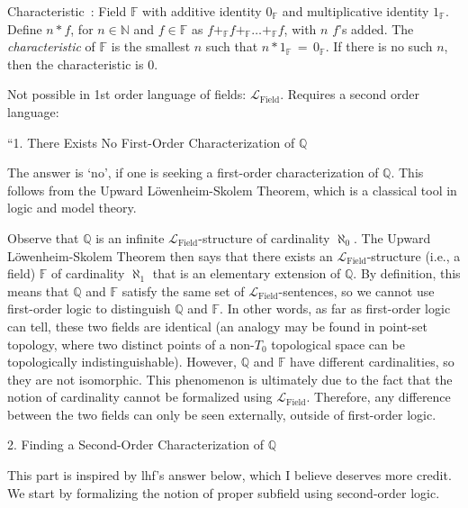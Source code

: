 Characteristic~\cite{wiki:Field_mathematics}: 
Field $\mathbb{F}$ with additive identity $0_{\mathbb{F}}$
and multiplicative identity $1_{\mathbb{F}}$.
Define $n \ast f$, for $n \in \mathbb{N}$ and $f \in \mathbb{F}$
as $f +_{\mathbb{F}} f +_{\mathbb{F}} \ldots +_{\mathbb{F}} f$, 
with $n$ $f$'s added.
The \textit{characteristic} of $\mathbb{F}$
is the smallest $n$ such that 
$n \ast 1_{\mathbb{F}} \,=\, 0_{\mathbb{F}}$.
If there is no such $n$, then the characteristic is 
$0$.


Not possible in 1st order language of fields:
$ \mathcal{L}_{\text{Field}} $.
Requires a second order language:


``1. There Exists No First-Order Characterization of $ \mathbb{Q} $

The answer is ‘no’, if one is seeking a first-order 
characterization of $ \mathbb{Q} $. 
This follows from the Upward Löwenheim-Skolem Theorem, 
which is a classical tool in logic and model theory.

Observe that $ \mathbb{Q} $ is an infinite 
$ \mathcal{L}_{\text{Field}} $-structure 
of cardinality $ \aleph_{0} $. 
The Upward L\"{o}wenheim-Skolem Theorem then says that 
there exists an $ \mathcal{L}_{\text{Field}} $-structure 
(i.e., a field) $ \mathbb{F} $ of cardinality $ \aleph_{1} $ 
that is an elementary extension of $ \mathbb{Q} $. 
By definition, this means that $ \mathbb{Q} $ and $ \mathbb{F} $ 
satisfy the same set of $ \mathcal{L}_{\text{Field}} $-sentences, 
so we cannot use first-order logic to distinguish $ \mathbb{Q} $ 
and $ \mathbb{F} $. In other words, as far as first-order logic 
can tell, these two fields are identical
(an analogy may be found in point-set topology,
where two distinct points of a non-$ T_{0} $ topological space 
can be topologically indistinguishable). 
However, $ \mathbb{Q} $ and $ \mathbb{F} $ have different 
cardinalities, so they are not isomorphic. 
This phenomenon is ultimately due to the fact 
that the notion of cardinality cannot be formalized
 using $ \mathcal{L}_{\text{Field}} $. 
 Therefore, any difference between the two fields 
 can only be seen externally, outside of first-order logic.

2. Finding a Second-Order Characterization of $ \mathbb{Q} $

This part is inspired by lhf's answer below, 
which I believe deserves more credit. 
We start by formalizing the notion of proper subfield 
using second-order logic.

